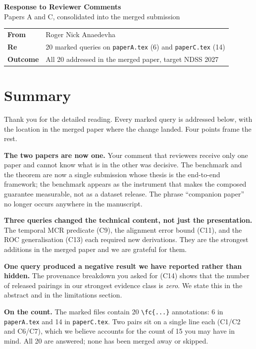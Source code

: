 \documentclass[11pt,a4paper]{article}
\begin{document}
\begin{center}
{\Large\bfseries Response to Reviewer Comments}\\[0.35em]
{\large Papers A and C, consolidated into the merged submission}\\[0.9em]
\begin{tabular}{@{}ll@{}}
\textbf{From} & Roger Nick Anaedevha\\
\textbf{Re} & 20 marked queries on \texttt{paperA.tex} (6) and \texttt{paperC.tex} (14)\\
\textbf{Outcome} & All 20 addressed in the merged paper, target NDSS 2027\\
\end{tabular}
\end{center}

\vspace{0.6em}

\section*{Summary}

Thank you for the detailed reading. Every marked query is addressed below, with
the location in the merged paper where the change landed. Four points frame the
rest.

\textbf{The two papers are now one.} Your comment that reviewers receive only
one paper and cannot know what is in the other was decisive. The benchmark and
the theorem are now a single submission whose thesis is the end-to-end
framework; the benchmark appears as the instrument that makes the composed
guarantee measurable, not as a dataset release. The phrase ``companion paper''
no longer occurs anywhere in the manuscript.

\textbf{Three queries changed the technical content, not just the presentation.}
The temporal MCR predicate (C9), the alignment error bound (C11), and the ROC
generalisation (C13) each required new derivations. They are the strongest
additions in the merged paper and we are grateful for them.

\textbf{One query produced a negative result we have reported rather than
hidden.} The provenance breakdown you asked for (C14) shows that the number of
released pairings in our strongest evidence class is \emph{zero}. We state this
in the abstract and in the limitations section.

\textbf{On the count.} The marked files contain 20 \verb|\fc{...}| annotations:
6 in \texttt{paperA.tex} and 14 in \texttt{paperC.tex}. Two pairs sit on a
single line each (C1/C2 and C6/C7), which we believe accounts for the count of
15 you may have in mind. All 20 are answered; none has been merged away or
skipped.
\end{document}
